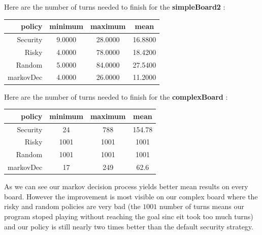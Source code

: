 \documentclass{eplDoc}
\begin{document}
Here are the number of turns needed to finish for the \textbf{simpleBoard2} : 


\begin{center}
		\begin{tabular}{|r|ccc|}
			\hline
			policy & minimum & maximum & mean \\ 
			\hline
			 Security &     9.0000  & 28.0000  & 16.8800 \\
    Risky & 4.0000  & 78.0000 &  18.4200 \\ 
    Random & 5.0000  & 84.0000 &  27.5400 \\ 
    markovDec & 4.0000 &  26.0000  & 11.2000  \\ 
   		\hline
		\end{tabular}
\end{center}

Here are the number of turns needed to finish for the \textbf{complexBoard} : 


\begin{center}
		\begin{tabular}{|r|ccc|}
			\hline
			policy & minimum & maximum & mean \\ 
			\hline
			 Security &                            24          &             788         &           154.78 \\
       Risky &               1001           &           1001          &            1001 \\ 
       Random &               1001        &             1001             &         1001 \\ 
       markovDec &                 17         &              249             &         62.6 \\ 
 
   		\hline
		\end{tabular}
\end{center}

As we can see our markov decision process yields better mean results on every board. However the improvement is most visible on our complex board where the risky and random policies are very bad (the $1001$ number of turns means our program stoped playing without reaching the goal sinc eit took too much turns) and our policy is still nearly two times better than the default security strategy. 
\end{document}
